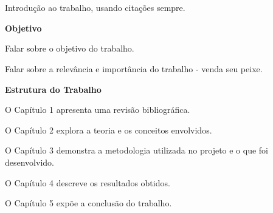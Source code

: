 \chapter*{}
\noindent
{}



\vspace{1.4cm}


Introdução ao trabalho, usando citações sempre.
    
\vspace{0.5cm}
\textbf{Objetivo}
\vspace{0.5cm}

Falar sobre o objetivo do trabalho.

Falar sobre a relevância e importância do trabalho - venda seu peixe. 

\vspace{0.5cm}
\textbf{Estrutura do Trabalho}
\vspace{0.5cm}

O Capítulo 1 apresenta uma revisão bibliográfica.

O Capítulo 2 explora a teoria e os conceitos envolvidos.

O Capítulo 3 demonstra a metodologia utilizada no projeto e o que foi desenvolvido.

O Capítulo 4 descreve os resultados obtidos.

O Capítulo 5 expõe a conclusão do trabalho.




\vspace{10mm} %

